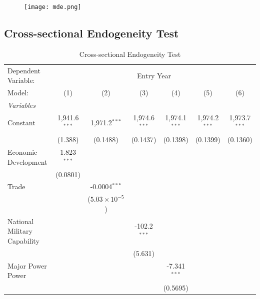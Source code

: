 \documentclass[12pt,a4paper]{article}
\begin{document}
\begin{appendices}
\begin{figure}[!hptb]
\centering
\texttt{[image: mde.png]}
\caption{\label{mde}}
\end{figure}

\subsection{Cross-sectional Endogeneity Test}\label{app3}
\begin{table}[!hptb]
\centering
\caption{Cross-sectional Endogeneity Test\label{cset}}
\begin{tabular}{lcccccc}
   \tabularnewline \midrule \midrule
   Dependent Variable: & \multicolumn{6}{c}{Entry Year}\\
   Model:         & (1)             & (2)                     & (3)             & (4)             & (5)             & (6)\\  
   \midrule
   \emph{Variables}\\
   Constant       & 1,941.6$^{***}$ & 1,971.2$^{***}$         & 1,974.6$^{***}$ & 1,974.1$^{***}$ & 1,974.2$^{***}$ & 1,973.7$^{***}$\\   
                  & (1.388)         & (0.1488)                & (0.1437)        & (0.1398)        & (0.1399)        & (0.1360)\\   
   Economic Development     & 1.823$^{***}$   &                         &                 &                 &                 &   \\   
                  & (0.0801)        &                         &                 &                 &                 &   \\   
   Trade     &                 & -0.0004$^{***}$         &                 &                 &                 &   \\   
                  &                 & ($5.03\times 10^{-5}$)  &                 &                 &                 &   \\   
   National Military Capability       &                 &                         & -102.2$^{***}$  &                 &                 &   \\   
                  &                 &                         & (5.631)         &                 &                 &   \\   
   Major Power Power          &                 &                         &                 & -7.341$^{***}$  &                 &   \\   
                  &                 &                         &                 & (0.5695)        &                 &   \\   

\end{tabular}
\end{table}
\end{appendices}
\end{document}
